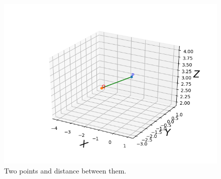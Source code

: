\begin{enumerate}[label=\thesection.\arabic*.,ref=\thesection.\theenumi]
\begin{figure}[!ht]
\centering
\includegraphics[width=\columnwidth]{./figs/point_distance.png}
\caption{Two points and distance between them.}
\label{fig:point_distance}
\end{figure}



\end{enumerate}
